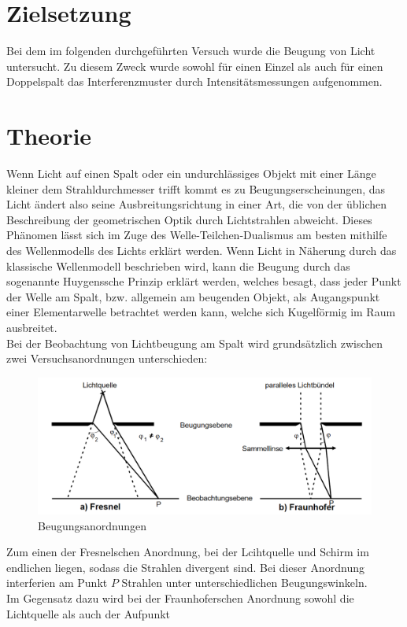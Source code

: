 \section{Zielsetzung}
Bei dem im folgenden durchgeführten Versuch wurde die Beugung von Licht untersucht. Zu diesem Zweck wurde sowohl für einen Einzel als 
auch für einen Doppelspalt das Interferenzmuster durch Intensitätsmessungen aufgenommen.
\section{Theorie}
Wenn Licht auf einen Spalt oder ein undurchlässiges Objekt mit einer Länge kleiner dem Strahldurchmesser trifft kommt es zu Beugungserscheinungen,
das Licht ändert also seine Ausbreitungsrichtung in einer Art, die von der üblichen Beschreibung der geometrischen Optik durch Lichtstrahlen
abweicht. Dieses Phänomen lässt sich im Zuge des Welle-Teilchen-Dualismus am besten mithilfe des Wellenmodells des Lichts erklärt werden.
Wenn Licht in Näherung durch das klassische Wellenmodell beschrieben wird, kann die Beugung durch das sogenannte Huygenssche Prinzip erklärt werden,
welches besagt, dass jeder Punkt der Welle am Spalt, bzw. allgemein am beugenden Objekt, als Augangspunkt einer Elementarwelle betrachtet werden kann, welche 
sich Kugelförmig im Raum ausbreitet. \\
Bei der Beobachtung von Lichtbeugung am Spalt wird grundsätzlich zwischen zwei Versuchsanordnungen unterschieden: 
\begin{figure} [h]
    \centering
    \includegraphics[width=14cm, keepaspectratio]{Beugungsanordnungen}
    \caption{Beugungsanordnungen}
 \end{figure}
Zum einen der Fresnelschen Anordnung, bei der
Lcihtquelle und Schirm im endlichen liegen, sodass die Strahlen divergent sind. Bei dieser Anordnung interferien am Punkt $P$ Strahlen unter
unterschiedlichen Beugungswinkeln. \\ Im Gegensatz dazu wird bei der Fraunhoferschen Anordnung sowohl die Lichtquelle als auch der Aufpunkt
